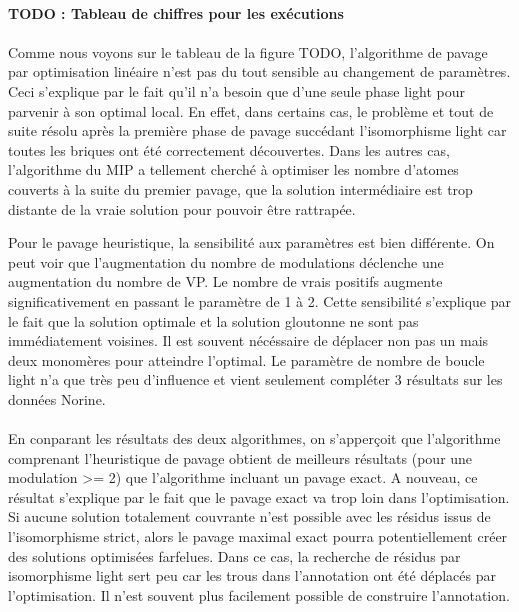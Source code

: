 \documentclass[12pt,french,twoside]{report}
\begin{document}
\paragraph{TODO : Tableau de chiffres pour les exécutions}


\paragraph{}Comme nous voyons sur le tableau de la figure TODO, l'algorithme de pavage par optimisation linéaire n'est pas du tout sensible au changement de paramètres.
Ceci s'explique par le fait qu'il n'a besoin que d'une seule phase light pour parvenir à son optimal local.
En effet, dans certains cas, le problème et tout de suite résolu après la première phase de pavage succédant l'isomorphisme light car toutes les briques ont été correctement découvertes.
Dans les autres cas, l'algorithme du MIP a tellement cherché à optimiser les nombre d'atomes couverts à la suite du premier pavage, que la solution intermédiaire est trop distante de la vraie solution pour pouvoir être rattrapée.

Pour le pavage heuristique, la sensibilité aux paramètres est bien différente.
On peut voir que l'augmentation du nombre de modulations déclenche une augmentation du nombre de VP.
Le nombre de vrais positifs augmente significativement en passant le paramètre de 1 à 2.
Cette sensibilité s'explique par le fait que la solution optimale et la solution gloutonne ne sont pas immédiatement voisines.
Il est souvent nécéssaire de déplacer non pas un mais deux monomères pour atteindre l'optimal.
Le paramètre de nombre de boucle light n'a que très peu d'influence et vient seulement compléter 3 résultats sur les données Norine.

\paragraph{}En conparant les résultats des deux algorithmes, on s'apperçoit que l'algorithme comprenant l'heuristique de pavage obtient de meilleurs résultats (pour une modulation >= 2) que l'algorithme incluant un pavage exact.
A nouveau, ce résultat s'explique par le fait que le pavage exact va trop loin dans l'optimisation.
Si aucune solution totalement couvrante n'est possible avec les résidus issus de l'isomorphisme strict, alors le pavage maximal exact pourra potentiellement créer des solutions optimisées farfelues.
Dans ce cas, la recherche de résidus par isomorphisme light sert peu car les trous dans l'annotation ont été déplacés par l'optimisation.
Il n'est souvent plus facilement possible de construire l'annotation.
\end{document}
